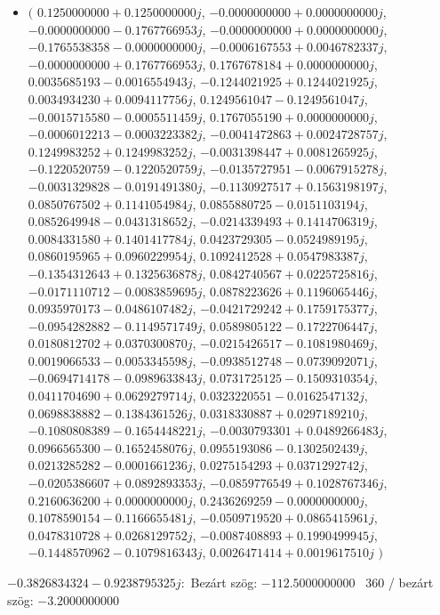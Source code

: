 \documentclass[14pt,a4paper]{article}
\begin{document}
\begin{itemize}
\item
$\big($
$0.1250000000+0.1250000000j$, $-0.0000000000+0.0000000000j$, $-0.0000000000-0.1767766953j$, $-0.0000000000+0.0000000000j$, $-0.1765538358-0.0000000000j$, $-0.0006167553+0.0046782337j$, $-0.0000000000+0.1767766953j$, $0.1767678184+0.0000000000j$, $0.0035685193-0.0016554943j$, $-0.1244021925+0.1244021925j$, $0.0034934230+0.0094117756j$, $0.1249561047-0.1249561047j$, $-0.0015715580-0.0005511459j$, $0.1767055190+0.0000000000j$, $-0.0006012213-0.0003223382j$, $-0.0041472863+0.0024728757j$, $0.1249983252+0.1249983252j$, $-0.0031398447+0.0081265925j$, $-0.1220520759-0.1220520759j$, $-0.0135727951-0.0067915278j$, $-0.0031329828-0.0191491380j$, $-0.1130927517+0.1563198197j$, $0.0850767502+0.1141054984j$, $0.0855880725-0.0151103194j$, $0.0852649948-0.0431318652j$, $-0.0214339493+0.1414706319j$, $0.0084331580+0.1401417784j$, $0.0423729305-0.0524989195j$, $0.0860195965+0.0960229954j$, $0.1092412528+0.0547983387j$, $-0.1354312643+0.1325636878j$, $0.0842740567+0.0225725816j$, $-0.0171110712-0.0083859695j$, $0.0878223626+0.1196065446j$, $0.0935970173-0.0486107482j$, $-0.0421729242+0.1759175377j$, $-0.0954282882-0.1149571749j$, $0.0589805122-0.1722706447j$, $0.0180812702+0.0370300870j$, $-0.0215426517-0.1081980469j$, $0.0019066533-0.0053345598j$, $-0.0938512748-0.0739092071j$, $-0.0694714178-0.0989633843j$, $0.0731725125-0.1509310354j$, $0.0411704690+0.0629279714j$, $0.0323220551-0.0162547132j$, $0.0698838882-0.1384361526j$, $0.0318330887+0.0297189210j$, $-0.1080808389-0.1654448221j$, $-0.0030793301+0.0489266483j$, $0.0966565300-0.1652458076j$, $0.0955193086-0.1302502439j$, $0.0213285282-0.0001661236j$, $0.0275154293+0.0371292742j$, $-0.0205386607+0.0892893353j$, $-0.0859776549+0.1028767346j$, $0.2160636200+0.0000000000j$, $0.2436269259-0.0000000000j$, $0.1078590154-0.1166655481j$, $-0.0509719520+0.0865415961j$, $0.0478310728+0.0268129752j$, $-0.0087408893+0.1990499945j$, $-0.1448570962-0.1079816343j$, $0.0026471414+0.0019617510j$
$\big)$
\end{itemize}
$-0.3826834324-0.9238795325j$:\
Bezárt szög: $-112.5000000000$ \
360 / bezárt szög: $-3.2000000000$\
\end{document}
